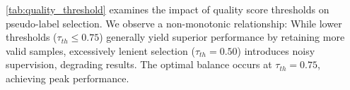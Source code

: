 \cref{tab:quality_threshold} examines the impact of quality score thresholds on pseudo-label selection. We observe a non-monotonic relationship: While lower thresholds ($\tau_{th} \leq 0.75$) generally yield superior performance by retaining more valid samples, excessively lenient selection ($\tau_{th}=0.50$) introduces noisy supervision, degrading results. The optimal balance occurs at $\tau_{th}=0.75$, achieving peak performance.








